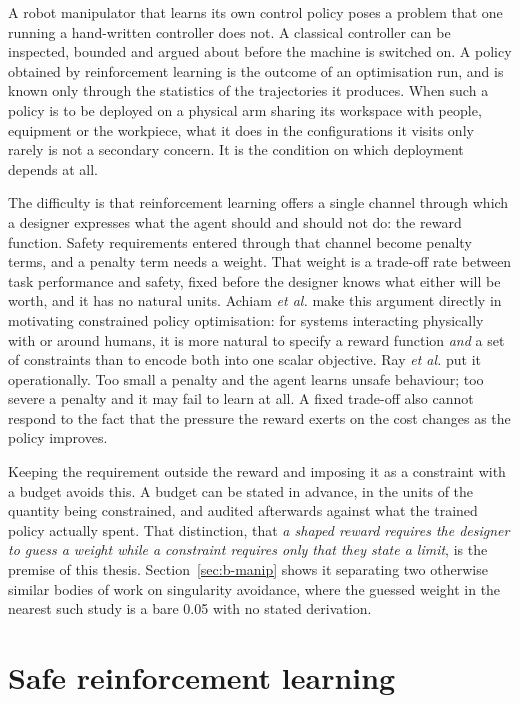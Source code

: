 A robot manipulator that learns its own control policy poses a problem that one running a
hand-written controller does not. A classical controller can be inspected, bounded and argued
about before the machine is switched on. A policy obtained by reinforcement learning is the
outcome of an optimisation run, and is known only through the statistics of the trajectories it
produces. When such a policy is to be deployed on a physical arm sharing its workspace with
people, equipment or the workpiece, what it does in the configurations it visits only rarely is
not a secondary concern. It is the condition on which deployment depends at all.

The difficulty is that reinforcement learning offers a single channel through which a designer
expresses what the agent should and should not do: the reward function. Safety requirements
entered through that channel become penalty terms, and a penalty term needs a weight. That
weight is a trade-off rate between task performance and safety, fixed before the designer knows
what either will be worth, and it has no natural units. Achiam \emph{et al.}
\cite{achiam2017cpo} make this argument directly in motivating constrained policy optimisation:
for systems interacting physically with or around humans, it is more natural to specify a reward
function \emph{and} a set of constraints than to encode both into one scalar objective. Ray
\emph{et al.} \cite{ray2019benchmarking} put it operationally. Too small a penalty and the agent
learns unsafe behaviour; too severe a penalty and it may fail to learn at all. A fixed trade-off
also cannot respond to the fact that the pressure the reward exerts on the cost changes as the
policy improves.

Keeping the requirement outside the reward and imposing it as a constraint with a budget avoids
this. A budget can be stated in advance, in the units of the quantity being constrained, and
audited afterwards against what the trained policy actually spent. That distinction, that
\emph{a shaped reward requires the designer to guess a weight while a constraint requires only
that they state a limit}, is the premise of this thesis. Section~\ref{sec:b-manip} shows it
separating two otherwise similar bodies of work on singularity avoidance, where the guessed
weight in the nearest such study is a bare 0.05 with no stated derivation.

\section{Safe reinforcement learning}\label{sec:b-saferl}

